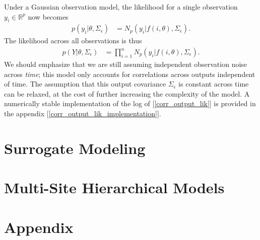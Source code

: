 \documentclass[12pt]{article}
\newcommand{\R}{\mathbb{R}}
\begin{document}
Under a Gaussian observation model, the likelihood for a single observation $y_i \in \R^p$ now becomes 
\begin{align}
p(y_i|\theta, \Sigma_\epsilon) &= N_p(y_i|f(i, \theta), \Sigma_\epsilon).
\end{align}
The likelihood across all observations is thus
\begin{align}
p(Y|\theta, \Sigma_\epsilon) &= \prod_{i = 1}^{n} N_p(y_i|f(i, \theta), \Sigma_\epsilon). \label{corr_output_lik}
\end{align}
We should emphasize that we are still assuming independent observation noise across \textit{time}; this model only accounts for correlations across outputs 
independent of time. The assumption that this output covariance $\Sigma_\epsilon$ is constant across time can be relaxed, at the cost of further increasing the 
complexity of the model. A numerically stable implementation of the log of [\ref{corr_output_lik}] is provided in the appendix [\ref{corr_output_lik_implementation}].


\section{Surrogate Modeling}
\section{Multi-Site Hierarchical Models}

\section{Appendix}
\end{document}
